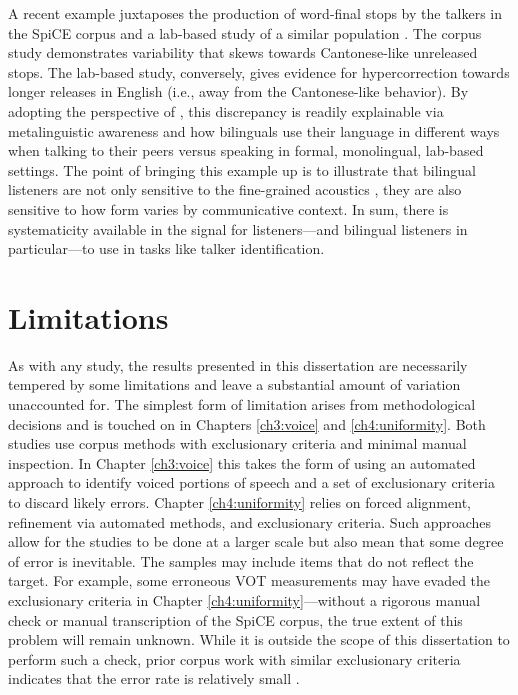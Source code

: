 A recent example juxtaposes the production of word-final stops by the talkers in the SpiCE corpus \citep{johnson_2021_language} and a lab-based study of a similar population \citep{polinsky_2018_heritage}. The corpus study demonstrates variability that skews towards Cantonese-like unreleased stops. The lab-based study, conversely, gives evidence for hypercorrection towards longer releases in English (i.e., away from the Cantonese-like behavior). By adopting the perspective of \citet{bullock_2009_sociophonetics}, this discrepancy is readily explainable via metalinguistic awareness and how bilinguals use their language in different ways when talking to their peers versus speaking in formal, monolingual, lab-based settings. The point of bringing this example up is to illustrate that bilingual listeners are not only sensitive to the fine-grained acoustics \citep{ju_2004_falling}, they are also sensitive to how form varies by communicative context. In sum, there is systematicity available in the signal for listeners---and bilingual listeners in particular---to use in tasks like talker identification. 

\section{Limitations}\label{ch5:sec:limitations}

As with any study, the results presented in this dissertation are necessarily tempered by some limitations and leave a substantial amount of variation unaccounted for. The simplest form of limitation arises from methodological decisions and is touched on in Chapters \ref{ch3:voice} and \ref{ch4:uniformity}. Both studies use corpus methods with exclusionary criteria and minimal manual inspection. In Chapter \ref{ch3:voice} this takes the form of using an automated approach to identify voiced portions of speech and a set of exclusionary criteria to discard likely errors. Chapter \ref{ch4:uniformity} relies on forced alignment, refinement via automated methods, and exclusionary criteria. Such approaches allow for the studies to be done at a larger scale but also mean that some degree of error is inevitable. The samples may include items that do not reflect the target. For example, some erroneous VOT measurements may have evaded the exclusionary criteria in Chapter \ref{ch4:uniformity}---without a rigorous manual check or manual transcription of the SpiCE corpus, the true extent of this problem will remain unknown. While it is outside the scope of this dissertation to perform such a check, prior corpus work with similar exclusionary criteria indicates that the error rate is relatively small \citep[5\%:][]{chodroff_2019_l2}.

